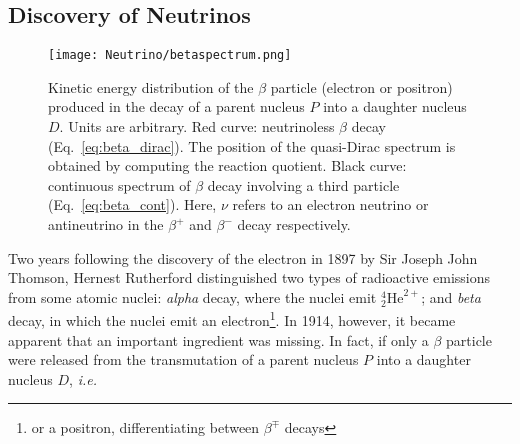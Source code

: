 \subsection{Discovery of Neutrinos}

\begin{figure}
\begin{center}
\texttt{[image: Neutrino/betaspectrum.png]}
\caption{Kinetic energy distribution of the $\beta$ particle (electron or positron) produced in the decay of a parent nucleus $P$ into a daughter nucleus $D$. Units are arbitrary. Red curve: neutrinoless $\beta$ decay (Eq.~\ref{eq:beta_dirac}). The position of the quasi-Dirac spectrum is obtained by computing the reaction quotient. Black curve: continuous spectrum of $\beta$ decay involving a third particle (Eq.~\ref{eq:beta_cont}). Here, $\nu$ refers to an electron neutrino or antineutrino in the $\beta^{+}$ and $\beta^{-}$ decay respectively.}
\label{fig:betaspectrum}
\end{center}
\end{figure}

Two years following the discovery of the electron in 1897 by Sir Joseph John Thomson, Hernest Rutherford distinguished two types of radioactive emissions from some atomic nuclei: \textit{alpha} decay, where the nuclei emit $^{4}_2 \mathrm{He}^{2+}$; and \textit{beta} decay, in which the nuclei emit an electron\footnote{or a positron, differentiating between $\beta^{\mp}$ decays}. In 1914, however, it became apparent that an important ingredient was missing. In fact, if only a $\beta$ particle were released from the transmutation of a parent nucleus $P$ into a daughter nucleus $D$, \textit{i.e.}

